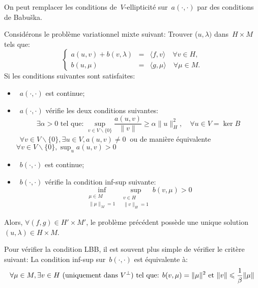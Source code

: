 \medskip



On peut remplacer les conditions de~$V$-ellipticité sur~$a(\cdot,\cdot)$ par des conditions
de Babuška.

\medskip
\begin{theoreme}
Considérons le problème variationnel mixte suivant:
Trouver ($u, \lambda)$ dans~$H\times M$ tels que:
 \begin{equation}\left\{
\begin{array}{rcl}
 a(u,v) + b(v, \lambda) &=& \langle f,v\rangle \quad \forall v\in H,\\
b(u,\mu) &=& \langle g,\mu\rangle \quad \forall \mu \in M.
\end{array}\right.
\end{equation}
Si les conditions suivantes sont satisfaites:
\begin{itemize}
  \item~$a(\cdot,\cdot)$ est continue;
  \item~$a(\cdot,\cdot)$ vérifie les deux conditions suivantes:
  \begin{equation}\exists \alpha> 0 \text{ tel que: } \sup_{v\in V\backslash\{0\}} \frac{a(u,v)}{\|v\|} \ge\alpha\|u\|_H^2, \quad \forall u\in V=\ker B\end{equation}
 ~$\forall v\in V\backslash\{0\}, \exists u\in V, a(u,v)\ne 0~$ ou de manière équivalente
~$\displaystyle\forall v\in V\backslash\{0\}, \sup_u a(u,v)> 0~$
  \item~$b(\cdot,\cdot)$ est continue;
  \item~$b(\cdot,\cdot)$ vérifie la condition inf-sup suivante:
\begin{equation}\inf_{\substack{\mu\in M\\\|\mu\|_M=1}} \sup_{\substack{v\in H\\\|v\|_H=1}} b(v,\mu) > 0\end{equation}
\end{itemize}
Alors, $\forall (f,g)\in H'\times M'$, le problème précédent possède une unique solution
$(u,\lambda) \in H\times M$.
\end{theoreme}
Pour vérifier la condition LBB, il est souvent plus simple de vérifier le critère suivant:
La condition inf-sup sur~$b(\cdot,\cdot)$ est équivalente à:
\begin{equation}\colorred
\forall\mu\in M, \exists v\in H \text{ (uniquement dans } V^\bot\text{) tel que: }
b(v,\mu)=\|\mu\|^2 \text{ et } \|v\|\le \dfrac1\beta \|\mu\|
\end{equation}









